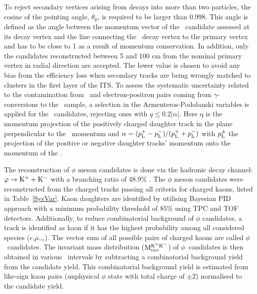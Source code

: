 To reject secondary vertices arising from decays into more than two particles, the cosine of the pointing angle, $\theta_{p}$, is required to be larger than 0.998. This angle is defined as the angle between the momentum vector of the \vo~candidate assessed at its decay vertex and the line connecting the \vo~decay vertex to the primary vertex and has to be close to 1 as a result of momentum conservation. In addition, only the candidates reconstructed between 5 and 100 cm from the nominal primary vertex in radial direction are accepted. The lower value is chosen to avoid any bias from the efficiency loss when secondary tracks are being wrongly matched to clusters in the first layer of the ITS. To assess the systematic uncertainty related to the contamination from \lambdas~and electron-positron pairs coming from $\gamma$-conversions to the \Ks~sample, a selection in the Armenteros-Podolanski variables \cite{doi:10.1080/14786440108520416} is applied for the \Ks~candidates, rejecting ones with $q\le 0.2|\alpha|$. Here q is the momentum projection of the positively charged daughter track in the plane perpendicular to the \vo~momentum and $\alpha = (p_{\rm{L}}^{+} - p_{\rm{L}}^{-})/(p_{\rm{L}}^{+} + p_{\rm{L}}^{-})$ with $p_{\rm{L}}^{\pm}$ the projection of the positive or negative daughter tracks' momentum onto the momentum of the
\vo.


The reconstruction of $\phi$ meson candidates is done via the hadronic decay channel: $\varphi \rightarrow {\rm K}^{+} + {\rm K}^{-}$ with a branching ratio of 48.9\% \cite{Olive_2016}. The $\phi$ meson candidates were reconstructed from the charged tracks passing all criteria for charged kaons, listed in Table~\ref{SysVar}. Kaon daughters are identified by utilising Bayesian PID approach \cite{Adam:2016acv} with a minimum probability threshold of $85\%$ using TPC and TOF detectors. Additionally, to reduce combinatorial background of $\phi$ candidates, a track is identified as kaon if it has the highest probability among all considered species ($e$,$\mu$,\pion,\kaon,\proton). The vector sum of all possible pairs of charged kaons are called $\phi$~candidates. The invariant mass distribution (${\rm M}_{inv}^{\rm K^{+}K^{-}}$) of $\phi$~candidates is then obtained in various \pT~intervals by subtracting a combinatorial background yield from the candidate yield. This combinatorial background yield is estimated from like-sign kaon pairs (unphysical $\phi$ state with total charge of $\pm2$) normalised to the candidate yield. 



